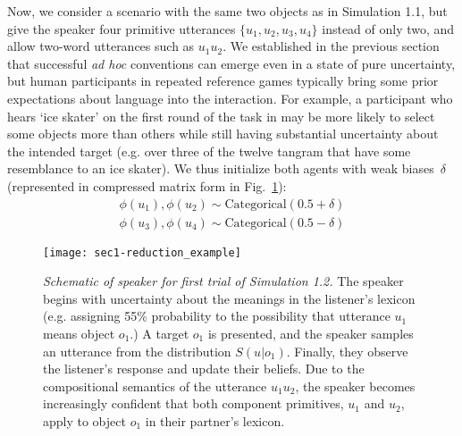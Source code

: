 Now, we consider a scenario with the same two objects as in Simulation 1.1, but give the speaker four primitive utterances $\{u_1, u_2, u_3, u_4\}$ instead of only two, and allow two-word utterances such as $u_1u_2$.
We established in the previous section that successful \emph{ad hoc} conventions can emerge even in a state of pure uncertainty, but human participants in repeated reference games typically bring some prior expectations about language into the interaction.
For example, a participant who hears `ice skater' on the first round of the task in  may be more likely to select some objects more than others while still having substantial uncertainty about the intended target (e.g. over three of the twelve tangram that have some resemblance to an ice skater).
We thus initialize both agents with weak biases $\delta$ (represented in compressed matrix form in Fig.~\ref{fig:sec1efficiency}):
\begin{align}
\phi(u_1), \phi(u_2) \sim \textrm{Categorical}(0.5 + \delta) \nonumber\\
\phi(u_3), \phi(u_4) \sim \textrm{Categorical}(0.5 - \delta) \nonumber
\end{align}

\begin{figure}
\centering
    \texttt{[image: sec1-reduction\_example]}
    \vspace{1em}
  \caption{\emph{Schematic of speaker for first trial of Simulation 1.2.} The speaker begins with uncertainty about the meanings in the listener's lexicon (e.g. assigning 55\% probability to the possibility that utterance $u_1$ means object $o_1$.) A target $o_1$ is presented, and the speaker samples an utterance from the distribution $S(u|o_1)$. Finally, they observe the listener's response and update their beliefs. Due to the compositional semantics of the utterance $u_1u_2$, the speaker becomes increasingly confident that both component primitives, $u_1$ and $u_2$, apply to object $o_1$ in their partner's lexicon.}
  \label{fig:sec1efficiency}
\end{figure}


